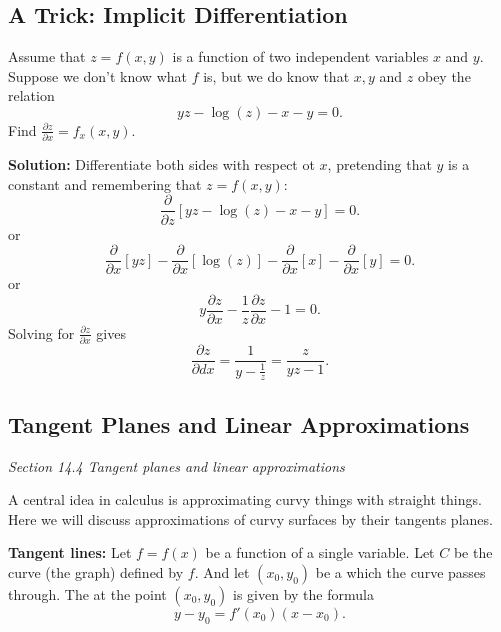 \documentclass[10pt]{article}
\theoremstyle{definition}
\newcommand{\vt}{\vskip 5mm} %
\newcommand{\fl}{\noindent\textbf} %
\newcommand{\Fl}{\vt\noindent\textbf} %
\newcommand{\1}[1]{\textbf{1}_{\left[#1\right]}} %
\newcommand{\dempfcolor}[1]{{\color{RoyalBlue}#1}}
\newcommand{\demph}[1]{\dempfcolor{{\sl #1}}}
\begin{document}
\subsection{A Trick: Implicit Differentiation}
Assume that $z=f(x,y)$ is a function of two independent variables $x$ and
$y$. Suppose we don't know what $f$ is, but we do know that $x,y$ and
$z$ obey the relation
\begin{equation*}
  yz - \log(z) - x - y = 0.
\end{equation*}
Find $\frac{\partial z}{\partial x} = f_{x}(x,y)$.

\fl{Solution:} Differentiate both sides with respect ot $x$,
pretending that $y$ is a constant and remembering that $z=f(x,y)$:
\begin{equation*}
  \frac{\partial }{\partial z}\left[ yz - \log(z) - x - y  \right] =0.
\end{equation*}
or
\begin{equation*}
  \frac{\partial }{\partial x}\left[ yz  \right]  - \frac{\partial }{\partial x}\left[ \log(z) \right]  - \frac{\partial }{\partial x}\left[ x \right]  - \frac{\partial }{\partial x}\left[ y \right]  =0.
\end{equation*}
or
\begin{equation*}
  y\frac{\partial z}{\partial x}  - \frac{1}{z}\frac{\partial z}{\partial x}  - 1=0.
\end{equation*}
Solving for $\frac{\partial z}{\partial x}$ gives
\begin{equation*}
  \frac{\partial z}{\partial dx} = \frac{1}{y-\frac{1}{z}} = \frac{z}{yz-1}.
\end{equation*}
\subsection{Tangent Planes and Linear Approximations}
\textit{Section 14.4 Tangent planes and linear approximations}

A central idea in calculus is approximating curvy things with straight things.
Here we will discuss approximations of curvy surfaces by their tangents planes. 

\Fl{Tangent lines:} Let $f= f(x)$ be a function of a single variable. Let $C$
be the curve (the graph) defined by $f$. And let $(x_{0},y_{0})$ be a which
the curve passes through. The \demph{tangent line} at the point $(x_{0},y_{0})$ is
given by the formula
\begin{equation*}
  y-y_{0} = f'(x_{0})(x-x_{0}).
\end{equation*}
\end{document}
